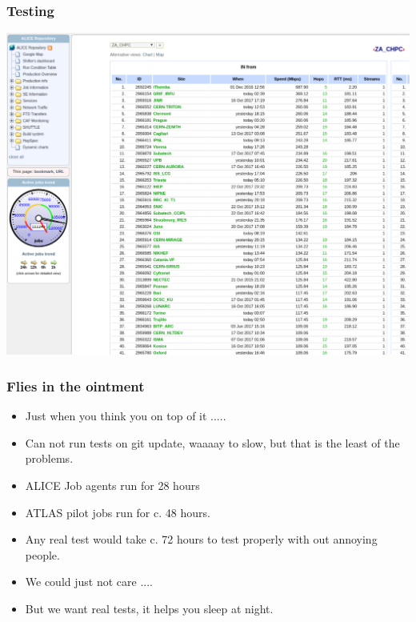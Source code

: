 \documentclass{beamer}
\begin{document}
\begin{frame}
    \frametitle{Testing}
    \includegraphics[scale=0.35]{BandwidthTests.pdf}
\end{frame}

\begin{frame}
    \frametitle{Flies in the ointment}
    \begin{itemize}
            \item <1->Just when you think you on top of it .....
                \item <2-> Can not run tests on git update, waaaay to slow, but that is the least of the problems.
                    \item <3-> ALICE Job agents run for 28 hours
                        \item <4-> ATLAS pilot jobs run for c. 48 hours.
                            \item <5-> Any real test would take c. 72 hours to test properly with out annoying people.
                                \item <6-> We could just not care ....
                                    \item <7-> But we want real tests, it helps you sleep at night.
    \end{itemize}
\end{frame}
\end{document}
